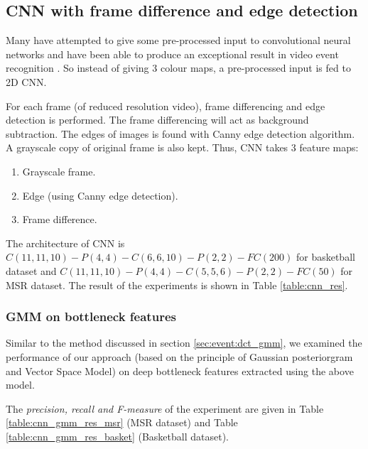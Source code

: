 \subsection{CNN with frame difference and edge detection}

Many have attempted to give some pre-processed input to convolutional neural networks and have been able to produce an exceptional result in video event recognition \citep{ji20133d}.  So instead of giving 3 colour maps, a pre-processed input is fed to 2D CNN.

For each frame (of reduced resolution video), frame differencing and edge detection is performed.  The frame differencing will act as background subtraction.  The edges of images is found with Canny edge detection algorithm.  A grayscale copy of original frame is also kept.  Thus, CNN takes 3 feature maps:
\begin{enumerate}
\item Grayscale frame.
\item Edge (using Canny edge detection).
\item Frame difference.
\end{enumerate}

The architecture of CNN is $C(11, 11, 10)-P(4, 4)-C(6, 6, 10)-P(2, 2)-FC(200)$ for basketball dataset and $C(11, 11, 10)-P(4,4)-C(5, 5, 6)-P(2,2)-FC(50)$ for MSR dataset.  The result of the experiments is shown in Table \ref{table:cnn_res}.


\subsubsection{GMM on bottleneck features}
Similar to the method discussed in section \ref{sec:event:dct_gmm}, we examined the performance of our approach (based on the principle of Gaussian posteriorgram and Vector Space Model) on deep bottleneck features extracted using   the above model.

The \textit{precision, recall and F-measure} of the experiment are given in Table \ref{table:cnn_gmm_res_msr} (MSR dataset) and Table \ref{table:cnn_gmm_res_basket} (Basketball dataset).

